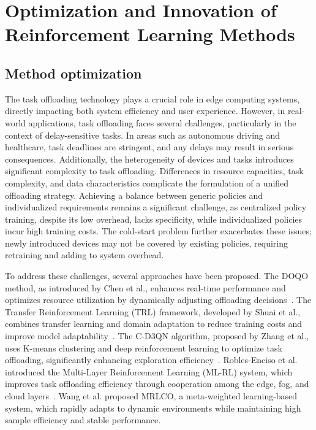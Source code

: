 \documentclass[journal]{IEEEtran}
\begin{document}
\section{Optimization and Innovation of Reinforcement Learning Methods}

\subsection{Method optimization}

The task offloading technology plays a crucial role in edge computing systems, directly impacting both system efficiency and user experience. However, in real-world applications, task offloading faces several challenges, particularly in the context of delay-sensitive tasks. In areas such as autonomous driving and healthcare, task deadlines are stringent, and any delays may result in serious consequences. Additionally, the heterogeneity of devices and tasks introduces significant complexity to task offloading. Differences in resource capacities, task complexity, and data characteristics complicate the formulation of a unified offloading strategy. Achieving a balance between generic policies and individualized requirements remains a significant challenge, as centralized policy training, despite its low overhead, lacks specificity, while individualized policies incur high training costs. The cold-start problem further exacerbates these issues; newly introduced devices may not be covered by existing policies, requiring retraining and adding to system overhead.

To address these challenges, several approaches have been proposed. The DOQO method, as introduced by Chen et al., enhances real-time performance and optimizes resource utilization by dynamically adjusting offloading decisions~\cite{zhou01}. The Transfer Reinforcement Learning (TRL) framework, developed by Shuai et al., combines transfer learning and domain adaptation to reduce training costs and improve model adaptability~\cite{zhou02}. The C-D3QN algorithm, proposed by Zhang et al., uses K-means clustering and deep reinforcement learning to optimize task offloading, significantly enhancing exploration efficiency~\cite{zhou03}. Robles-Enciso et al. introduced the Multi-Layer Reinforcement Learning (ML-RL) system, which improves task offloading efficiency through cooperation among the edge, fog, and cloud layers~\cite{zhou04}. Wang et al. proposed MRLCO, a meta-weighted learning-based system, which rapidly adapts to dynamic environments while maintaining high sample efficiency and stable performance.~\cite{zhou05}
\end{document}
